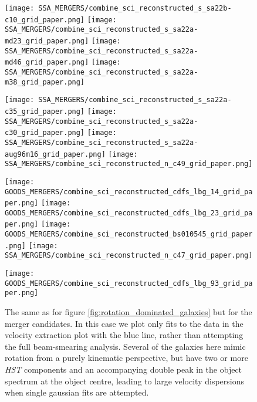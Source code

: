 \documentclass[fleqn,usenatbib]{mn2e}
\begin{document}
\begin{figure*}\ContinuedFloat
    \centering

    \texttt{[image: SSA\_MERGERS/combine\_sci\_reconstructed\_s\_sa22b-c10\_grid\_paper.png]}
    \texttt{[image: SSA\_MERGERS/combine\_sci\_reconstructed\_s\_sa22a-md23\_grid\_paper.png]}
    \texttt{[image: SSA\_MERGERS/combine\_sci\_reconstructed\_s\_sa22a-md46\_grid\_paper.png]}
    \texttt{[image: SSA\_MERGERS/combine\_sci\_reconstructed\_s\_sa22a-m38\_grid\_paper.png]}    


\end{figure*}

\begin{figure*}\ContinuedFloat
    \centering

    \texttt{[image: SSA\_MERGERS/combine\_sci\_reconstructed\_s\_sa22a-c35\_grid\_paper.png]}
    \texttt{[image: SSA\_MERGERS/combine\_sci\_reconstructed\_s\_sa22a-c30\_grid\_paper.png]}
    \texttt{[image: SSA\_MERGERS/combine\_sci\_reconstructed\_s\_sa22a-aug96m16\_grid\_paper.png]}
    \texttt{[image: SSA\_MERGERS/combine\_sci\_reconstructed\_n\_c49\_grid\_paper.png]}    


\end{figure*}

\begin{figure*}\ContinuedFloat
    \centering

    \texttt{[image: GOODS\_MERGERS/combine\_sci\_reconstructed\_cdfs\_lbg\_14\_grid\_paper.png]}
    \texttt{[image: GOODS\_MERGERS/combine\_sci\_reconstructed\_cdfs\_lbg\_23\_grid\_paper.png]}
    \texttt{[image: GOODS\_MERGERS/combine\_sci\_reconstructed\_bs010545\_grid\_paper.png]}
    \texttt{[image: SSA\_MERGERS/combine\_sci\_reconstructed\_n\_c47\_grid\_paper.png]}


\end{figure*}

\begin{figure*}\ContinuedFloat
    \centering

    \texttt{[image: GOODS\_MERGERS/combine\_sci\_reconstructed\_cdfs\_lbg\_93\_grid\_paper.png]}

    \caption{The same as for figure \protect\ref{fig:rotation_dominated_galaxies} but for the merger candidates.
    In this case we plot only fits to the data in the velocity extraction plot with the blue line, rather than attempting the full beam-smearing analysis.
    Several of the galaxies here mimic rotation from a purely kinematic perspective, but have two or more {\em HST} components and an accompanying double peak in the object spectrum at the object centre, leading to large velocity dispersions when single gaussian fits are attempted.}
    \label{fig:merger_galaxies}
\end{figure*}


\bsp    %
\label{lastpage}
\end{document}
